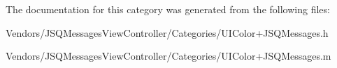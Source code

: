 The documentation for this category was generated from the following files\+:\begin{DoxyCompactItemize}
\item 
Vendors/\+J\+S\+Q\+Messages\+View\+Controller/\+Categories/U\+I\+Color+\+J\+S\+Q\+Messages.\+h\item 
Vendors/\+J\+S\+Q\+Messages\+View\+Controller/\+Categories/U\+I\+Color+\+J\+S\+Q\+Messages.\+m\end{DoxyCompactItemize}
